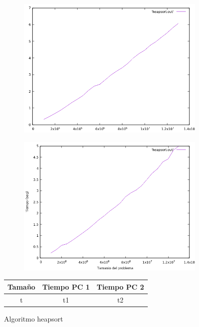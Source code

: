 \documentclass[12pt,spanish]{article}
\begin{document}
\begin{figure}[H]
\centering
\begin{subfigure}[b]{0.45\textwidth}
\includegraphics[scale=0.45]{empirica_heapsort.png}
\caption{}
\end{subfigure}
\quad
\begin{subfigure}[b]{0.45\textwidth}
\includegraphics[scale=0.45]{empirica_heapsort_2.png}
\caption{}
\end{subfigure}
\begin{tabular}{|c|c|c|}
\hline
\textbf{Tamaño} & \textbf{Tiempo PC 1} & \textbf{Tiempo PC 2} \\
\hline
t & t1 & t2 \\
\hline
\end{tabular}
\caption{Algoritmo heapsort}
\end{figure}
\end{document}
